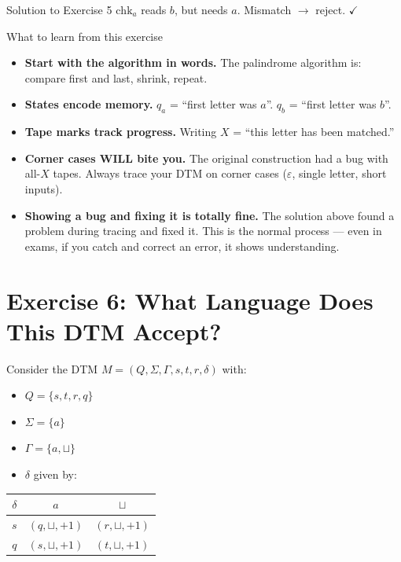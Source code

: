 \documentclass[11pt,a4paper]{article}
\newcommand{\blank}{\sqcup}
\begin{document}
\begin{solutionbox}{Solution to Exercise 5}
$\text{chk}_a$ reads $b$, but needs $a$. Mismatch $\to$ reject. $\checkmark$

\begin{hintbox}{What to learn from this exercise}
\begin{itemize}
    \item \textbf{Start with the algorithm in words.} The palindrome algorithm is: compare first and last, shrink, repeat.
    \item \textbf{States encode memory.} $q_a$ = ``first letter was $a$''. $q_b$ = ``first letter was $b$''.
    \item \textbf{Tape marks track progress.} Writing $X$ = ``this letter has been matched.''
    \item \textbf{Corner cases WILL bite you.} The original construction had a bug with all-$X$ tapes. Always trace your DTM on corner cases ($\varepsilon$, single letter, short inputs).
    \item \textbf{Showing a bug and fixing it is totally fine.} The solution above found a problem during tracing and fixed it. This is the normal process --- even in exams, if you catch and correct an error, it shows understanding.
\end{itemize}
\end{hintbox}
\end{solutionbox}

\newpage

\section*{Exercise 6: What Language Does This DTM Accept?}

Consider the DTM $M = (Q, \Sigma, \Gamma, s, t, r, \delta)$ with:
\begin{itemize}
    \item $Q = \{s, t, r, q\}$
    \item $\Sigma = \{a\}$
    \item $\Gamma = \{a, \blank\}$
    \item $\delta$ given by:
\end{itemize}

\begin{center}
\begin{tabular}{c|c|c}
$\delta$ & $a$ & $\blank$ \\
\hline
$s$ & $(q, \blank, +1)$ & $(r, \blank, +1)$ \\
$q$ & $(s, \blank, +1)$ & $(t, \blank, +1)$ \\
\end{tabular}
\end{center}
\end{document}
